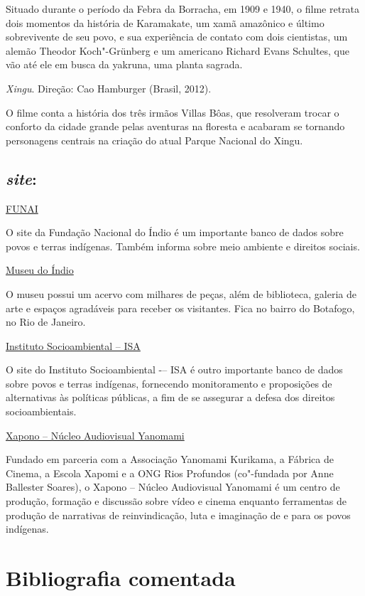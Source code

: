 \documentclass[12pt]{extarticle}
\begin{document}
Situado durante o período da Febra da Borracha, em 1909 e 1940, o filme 
retrata dois momentos da história de Karamakate, um xamã amazônico e último 
sobrevivente de seu povo, e sua experiência de contato com dois cientistas, 
um alemão Theodor Koch"-Grünberg e um americano Richard Evans Schultes, que 
vão até ele em busca da yakruna, uma planta sagrada. 

\textit{Xingu}. Direção: Cao Hamburger (Brasil, 2012).

O filme conta a história dos três irmãos Villas Bôas, que resolveram
trocar o conforto da cidade grande pelas aventuras na floresta e
acabaram se tornando personagens centrais na criação do atual Parque
Nacional do Xingu.

\subsection{\emph{site}:}

\href{http://www.gov.br/funai}{FUNAI}

O site da Fundação Nacional do Índio é um importante banco de dados
sobre povos e terras indígenas. Também informa sobre meio ambiente e
direitos sociais.

\href{http://www.museudoindio.gov.br/}{Museu do Índio}

O museu possui um acervo com milhares de peças, além de biblioteca,
galeria de arte e espaços agradáveis para receber os visitantes. Fica no
bairro do Botafogo, no Rio de Janeiro.

\href{https://www.socioambiental.org/pt-br}{Instituto Socioambiental -- ISA}

O site do Instituto Socioambiental -– ISA é outro importante banco de dados 
sobre povos e terras indígenas, fornecendo monitoramento e proposições de 
alternativas às políticas públicas, a fim de se assegurar a defesa dos direitos
socioambientais. 

\href{https://vimeo.com/xapono?fbclid=IwAR2dao6qx16C1AwtQMf4HGTWCCsQ7ItIUtpq1R8ZiNB4EACiVNuJ-mp_gu8}{Xapono -- Núcleo Audiovisual Yanomami}

Fundado em parceria com a Associação Yanomami Kurikama, a Fábrica de 
Cinema, a Escola Xapomi e a ONG Rios Profundos (co"-fundada por Anne 
Ballester Soares), o Xapono -- Núcleo Audiovisual Yanomami é um centro 
de produção, formação e discussão sobre vídeo e cinema enquanto 
ferramentas de produção de narrativas de reinvindicação, luta e 
imaginação de e para os povos indígenas.

\section{Bibliografia comentada}
\end{document}
